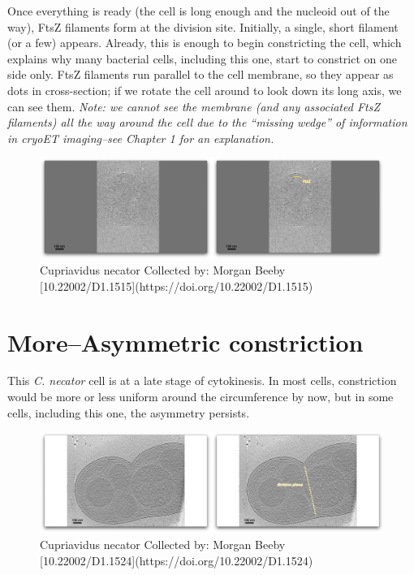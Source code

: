 \documentclass[]{tufte-book}
\begin{document}
Once everything is ready (the cell is long enough and the nucleoid out
of the way), FtsZ filaments form at the division site. Initially, a
single, short filament (or a few) appears. Already, this is enough to
begin constricting the cell, which explains why many bacterial cells,
including this one, start to constrict on one side only. FtsZ filaments
run parallel to the cell membrane, so they appear as dots in
cross-section; if we rotate the cell around to look down its long axis,
we can see them. \emph{Note: we cannot see the membrane (and any
associated FtsZ filaments) all the way around the cell due to the
``missing wedge'' of information in cryoET imaging--see Chapter 1 for an
explanation.}

\begin{figure}
\includegraphics{movie_stills/5_9} \caption[Cupriavidus necator Collected by]{Cupriavidus necator Collected by: Morgan Beeby [10.22002/D1.1515](https://doi.org/10.22002/D1.1515)}\label{fig:unnamed-chunk-93}
\end{figure}

\hypertarget{moreasymmetric-constriction}{\section{More--Asymmetric
constriction}\label{moreasymmetric-constriction}}

This \emph{C. necator} cell is at a late stage of cytokinesis. In most
cells, constriction would be more or less uniform around the
circumference by now, but in some cells, including this one, the
asymmetry persists.

\begin{figure}
\includegraphics{movie_stills/5_9a} \caption[Cupriavidus necator Collected by]{Cupriavidus necator Collected by: Morgan Beeby [10.22002/D1.1524](https://doi.org/10.22002/D1.1524)}\label{fig:unnamed-chunk-94}
\end{figure}
\end{document}
